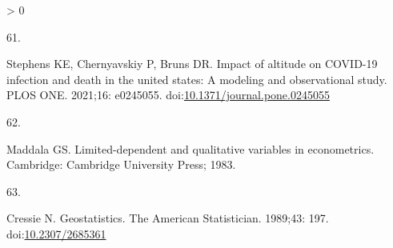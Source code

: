 \documentclass[10pt,letterpaper]{article}
\newlength{\csllabelwidth}
\newlength{\cslhangindent}
\newenvironment{CSLReferences}[3] %
 {%
  \setlength{\parindent}{0pt}
  \ifodd #1 \everypar{\setlength{\hangindent}{\cslhangindent}}\ignorespaces\fi
  \ifnum #2 > 0
  \setlength{\parskip}{#2\baselineskip}
  \fi
 }%
 {}
\newcommand{\CSLLeftMargin}[1]{\parbox[t]{\csllabelwidth}{#1}}
\newcommand{\CSLRightInline}[1]{\parbox[t]{\linewidth - \csllabelwidth}{#1}}
\begin{document}
\begin{CSLReferences}{0}{0}
\leavevmode\hypertarget{ref-Stephens2021impact}{}%
\CSLLeftMargin{61. }
\CSLRightInline{Stephens KE, Chernyavskiy P, Bruns DR. Impact of
altitude on COVID-19 infection and death in the united states: A
modeling and observational study. PLOS ONE. 2021;16: e0245055.
doi:\href{https://doi.org/10.1371/journal.pone.0245055}{10.1371/journal.pone.0245055}}

\leavevmode\hypertarget{ref-Maddala1983limited}{}%
\CSLLeftMargin{62. }
\CSLRightInline{Maddala GS. Limited-dependent and qualitative variables
in econometrics. Cambridge: Cambridge University Press; 1983. }

\leavevmode\hypertarget{ref-Cressie1989geostatistics}{}%
\CSLLeftMargin{63. }
\CSLRightInline{Cressie N. Geostatistics. The American Statistician.
1989;43: 197.
doi:\href{https://doi.org/10.2307/2685361}{10.2307/2685361}}

\end{CSLReferences}

\nolinenumbers
\end{document}
